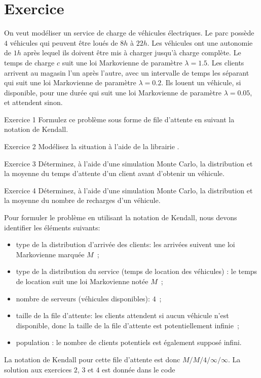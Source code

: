     \section{Exercice}
        On veut modéliser un service de charge de véhicules électriques. Le parc possède $4$ véhicules qui peuvent être loués de $8h$ à $22h$. Les véhicules ont une autonomie de $1h$ après lequel ils doivent être mis à charger jusqu'à charge complète. Le temps de charge $c$ suit une loi Markovienne de paramètre $\lambda = 1.5$. Les clients arrivent au magasin l'un après l'autre, avec un intervalle de temps les séparant qui suit une loi Markovienne de paramètre $\lambda = 0.2$. Ils louent un véhicule, si disponible, pour une durée qui suit une loi Markovienne de paramètre $\lambda=0.05$, et attendent sinon. 
        \begin{exercise}{Exercice 1}
            Formulez ce problème sous forme de file d'attente en suivant la notation de Kendall.
        \end{exercise}
        \begin{exercise}{Exercice 2}
            Modélisez la situation à l'aide de la librairie .
        \end{exercise}
        \begin{exercise}{Exercice 3}
            Déterminez, à l'aide d'une simulation Monte Carlo, la distribution et la moyenne du temps d'attente d'un client avant d'obtenir un véhicule.
        \end{exercise}
        \begin{exercise}{Exercice 4}
            Déterminez, à l'aide d'une simulation Monte Carlo, la distribution et la moyenne du nombre de recharges d'un véhicule.
        \end{exercise}

        Pour formuler le problème en utilisant la notation de Kendall, nous devons identifier les éléments suivants:
        \begin{itemize}
            \item type de la distribution d'arrivée des clients: les arrivées suivent une loi Markovienne marquée $M$~;
            \item type de la distribution du service (temps de location des véhicules) : le temps de location suit une loi Markovienne notée $M$~;
            \item nombre de serveurs (véhicules disponibles): $4$~;
            \item taille de la file d'attente: les clients attendent si aucun véhicule n'est disponible, donc la taille de la file d'attente est potentiellement infinie~;
            \item population : le nombre de clients potentiels est également supposé infini.
        \end{itemize}
        La notation de Kendall pour cette file d'attente est donc $M/M/4/\infty/\infty$.
        La solution aux exercices $2$, $3$ et $4$ est donnée dans le code
        \inputminted{python}{codes/charge.py}